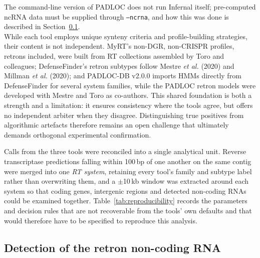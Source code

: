 
The command-line version of PADLOC does not run Infernal itself; pre-computed ncRNA data must be supplied through \texttt{--ncrna}, and how this was done is described in Section~\ref{sec:ncrna-search}.
\\

While each tool employs unique synteny criteria and profile-building strategies,
their content is not independent. MyRT's non-DGR, non-CRISPR profiles, retrons included, were built from RT collections assembled by Toro and colleagues; DefenseFinder's retron subtypes follow Mestre \emph{et al.} (2020) and Millman \emph{et al.} (2020); and PADLOC-DB v2.0.0 imports HMMs directly from DefenseFinder for several system families, while the PADLOC retron models were developed with Mestre and Toro as co-authors. This shared
foundation is both a strength and a limitation: it ensures consistency where the
tools agree, but offers no independent arbiter when they disagree. Distinguishing
true positives from algorithmic artefacts therefore remains an open challenge that
ultimately demands orthogonal experimental confirmation.

Calls from the three tools were reconciled into a single analytical unit. Reverse
transcriptase predictions falling within 100\,bp of one another on the same contig
were merged into one \emph{RT system}, retaining every tool's family and subtype
label rather than overwriting them, and a $\pm$10\,kb window was extracted around
each system so that coding genes, intergenic regions and detected non-coding RNAs
could be examined together. 
Table~\ref{tab:reproducibility} records the parameters
and decision rules that are not recoverable from the tools' own defaults and that
would therefore have to be specified to reproduce this analysis.



\subsection{Detection of the retron non-coding RNA}
\label{sec:ncrna-search}

